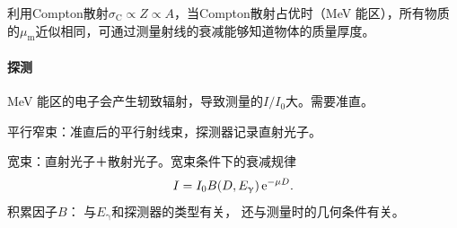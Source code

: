 利用Compton散射$\sigma_\mathrm C \propto Z \propto A$，当Compton散射占优时（\unit{MeV} 能区），所有物质的$\mu_\mathrm m$近似相同，可通过测量射线的衰减能够知道物体的质量厚度。

\paragraph{探测}
\unit{MeV} 能区的电子会产生轫致辐射，导致测量的$I/I_0$大。需要准直。

平行窄束：准直后的平行射线束，探测器记录直射光子。

宽束：直射光子＋散射光子。宽束条件下的衰减规律
\begin{equation}\label{eq:nrd-broad-beam-buildup}
	I = I_0B(D,E_\upgamma)\mathop{}\!\mathrm{e}^{-\mu D}.
\end{equation}
积累因子$B$：
与$E_\upgamma$和探测器的类型有关，
还与测量时的几何条件有关。


